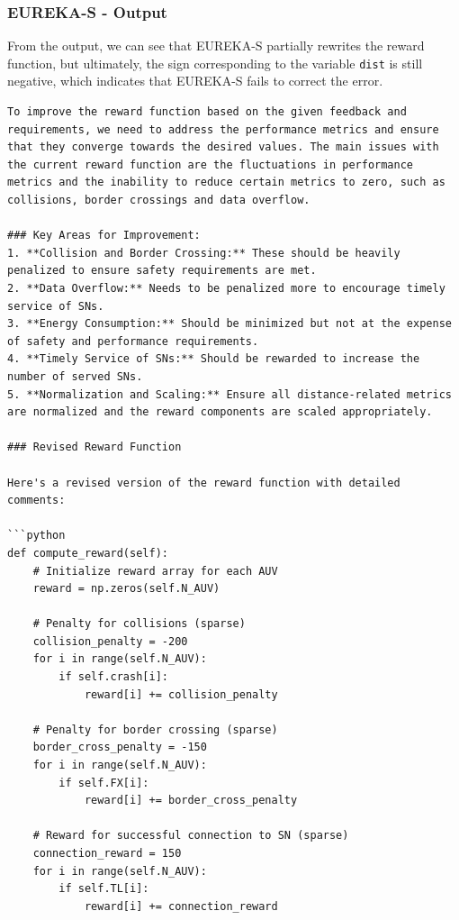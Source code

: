 \documentclass{article}
\begin{document}
\subsubsection{EUREKA-S - Output}

From the output, we can see that EUREKA-S partially rewrites the reward function, but ultimately, the sign corresponding to the variable \verb|dist| is still negative, which indicates that EUREKA-S fails to correct the error.

\begin{verbatim}
To improve the reward function based on the given feedback and requirements, we need to address the performance metrics and ensure that they converge towards the desired values. The main issues with the current reward function are the fluctuations in performance metrics and the inability to reduce certain metrics to zero, such as collisions, border crossings and data overflow.

### Key Areas for Improvement:
1. **Collision and Border Crossing:** These should be heavily penalized to ensure safety requirements are met.
2. **Data Overflow:** Needs to be penalized more to encourage timely service of SNs.
3. **Energy Consumption:** Should be minimized but not at the expense of safety and performance requirements.
4. **Timely Service of SNs:** Should be rewarded to increase the number of served SNs.
5. **Normalization and Scaling:** Ensure all distance-related metrics are normalized and the reward components are scaled appropriately.

### Revised Reward Function

Here's a revised version of the reward function with detailed comments:

```python
def compute_reward(self):
    # Initialize reward array for each AUV
    reward = np.zeros(self.N_AUV)

    # Penalty for collisions (sparse)
    collision_penalty = -200
    for i in range(self.N_AUV):
        if self.crash[i]:
            reward[i] += collision_penalty

    # Penalty for border crossing (sparse)
    border_cross_penalty = -150
    for i in range(self.N_AUV):
        if self.FX[i]:
            reward[i] += border_cross_penalty

    # Reward for successful connection to SN (sparse)
    connection_reward = 150
    for i in range(self.N_AUV):
        if self.TL[i]:
            reward[i] += connection_reward


\end{verbatim}
\end{document}
